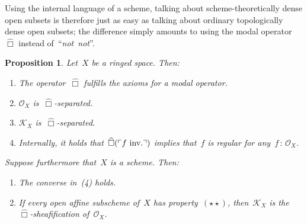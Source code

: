 \documentclass[10pt,reqno,a4paper]{amsbook}
\makeatletter
\theoremstyle{definition}
\theoremstyle{plain}
\newtheorem{prop}[defn]{Proposition}
\theoremstyle{remark}
\renewcommand{\O}{\mathcal{O}}
\newcommand{\K}{\mathcal{K}}
\newcommand{\?}{\,{:}\,}
\renewcommand{\_}{\mathpunct{.}\,}
\newcommand{\speak}[1]{\ulcorner\text{\textnormal{#1}}\urcorner}
\newcommand{\sdense}{{\widehat\Box}}
\newcommand{\inv}{inv.\@}
\newcommand{\notnot}{\emph{not~not}\xspace}
\makeatother
\begin{document}
Using the internal language of a scheme, talking about scheme-theoretically
dense open subsets is therefore just as easy as talking about ordinary
topologically dense open subsets; the difference simply amounts to using the
modal operator~$\sdense$ instead of~``\notnot''.

\begin{prop}\label{prop:kx-is-box-sheafification}
Let~$X$ be a ringed space. Then:
\begin{enumerate}
\item The operator~$\sdense$ fulfills the axioms for a modal operator.
\item $\O_X$ is~$\sdense$-separated.
\item $\K_X$ is~$\sdense$-separated.
\item Internally, it holds that~$\sdense(\speak{$f$ \inv})$ implies that~$f$ is
regular for any~$f\?\O_X$.
\end{enumerate}
Suppose furthermore that~$X$ is a scheme. Then:
\begin{enumerate}
\addtocounter{enumi}{4}
\item The converse in~(4) holds.
\item If every open affine subscheme of~$X$ has
property~$(\star\star)$, then~$\K_X$ is the~$\sdense$-sheafification of~$\O_X$.
\end{enumerate}
\end{prop}
\end{document}
